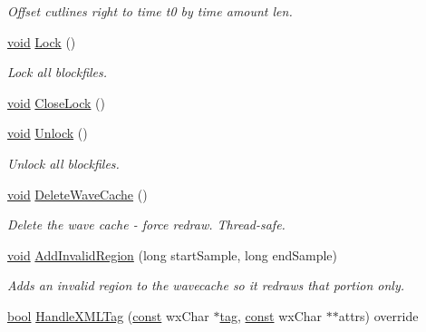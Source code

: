 \begin{DoxyCompactItemize}
\begin{DoxyCompactList}\small\item\em Offset cutlines right to time \textquotesingle{}t0\textquotesingle{} by time amount \textquotesingle{}len\textquotesingle{}. \end{DoxyCompactList}\item 
\hyperlink{sound_8c_ae35f5844602719cf66324f4de2a658b3}{void} \hyperlink{class_wave_clip_adecbc49d13d783a569fc29359fbbc89d}{Lock} ()
\begin{DoxyCompactList}\small\item\em Lock all blockfiles. \end{DoxyCompactList}\item 
\hyperlink{sound_8c_ae35f5844602719cf66324f4de2a658b3}{void} \hyperlink{class_wave_clip_aea9b994a9a24270712e7f4bd9b25120f}{Close\+Lock} ()
\item 
\hyperlink{sound_8c_ae35f5844602719cf66324f4de2a658b3}{void} \hyperlink{class_wave_clip_a957e4b414783b28da7aae6b7cd4e003f}{Unlock} ()
\begin{DoxyCompactList}\small\item\em Unlock all blockfiles. \end{DoxyCompactList}\item 
\hyperlink{sound_8c_ae35f5844602719cf66324f4de2a658b3}{void} \hyperlink{class_wave_clip_a736ff78f1a664cc76df09872abd6aa7a}{Delete\+Wave\+Cache} ()
\begin{DoxyCompactList}\small\item\em Delete the wave cache -\/ force redraw. Thread-\/safe. \end{DoxyCompactList}\item 
\hyperlink{sound_8c_ae35f5844602719cf66324f4de2a658b3}{void} \hyperlink{class_wave_clip_a638446857c18eac512aaae65d0fc85d3}{Add\+Invalid\+Region} (long start\+Sample, long end\+Sample)
\begin{DoxyCompactList}\small\item\em Adds an invalid region to the wavecache so it redraws that portion only. \end{DoxyCompactList}\item 
\hyperlink{mac_2config_2i386_2lib-src_2libsoxr_2soxr-config_8h_abb452686968e48b67397da5f97445f5b}{bool} \hyperlink{class_wave_clip_ae3270d41bc040b47c12c898f2726744c}{Handle\+X\+M\+L\+Tag} (\hyperlink{getopt1_8c_a2c212835823e3c54a8ab6d95c652660e}{const} wx\+Char $\ast$\hyperlink{structtag}{tag}, \hyperlink{getopt1_8c_a2c212835823e3c54a8ab6d95c652660e}{const} wx\+Char $\ast$$\ast$attrs) override
$$
\end{DoxyCompactItemize}
